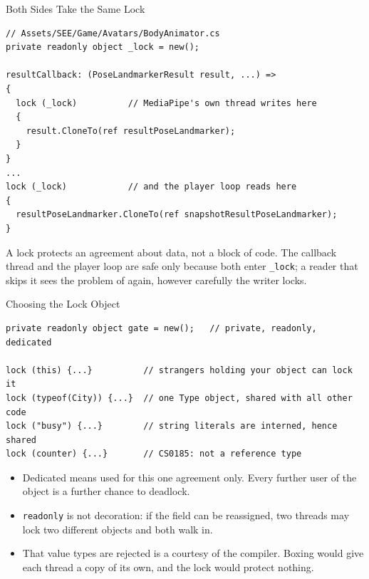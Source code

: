 \begin{frame}[fragile]{Both Sides Take the Same Lock}
  \begin{lstlisting}[basicstyle=\scriptsize\ttfamily]
// Assets/SEE/Game/Avatars/BodyAnimator.cs
private readonly object _lock = new();

resultCallback: (PoseLandmarkerResult result, ...) =>
{
  lock (_lock)          // MediaPipe's own thread writes here
  {
    result.CloneTo(ref resultPoseLandmarker);
  }
}
...
lock (_lock)            // and the player loop reads here
{
  resultPoseLandmarker.CloneTo(ref snapshotResultPoseLandmarker);
}
  \end{lstlisting}
  \vspace{1ex}

  A lock protects an agreement about data, not a block of code. The callback
  thread and the player loop are safe only because both enter
  \texttt{\_lock}; a reader that skips it sees the problem of
   again, however carefully the writer locks.
\end{frame}

\begin{frame}[fragile]{Choosing the Lock Object}
  \begin{lstlisting}[basicstyle=\scriptsize\ttfamily]
private readonly object gate = new();   // private, readonly, dedicated

lock (this) {...}          // strangers holding your object can lock it
lock (typeof(City)) {...}  // one Type object, shared with all other code
lock ("busy") {...}        // string literals are interned, hence shared
lock (counter) {...}       // CS0185: not a reference type
  \end{lstlisting}
  \vspace{1ex}

  \begin{itemize}
    \item Dedicated means used for this one agreement only. Every further user
      of the object is a further chance to deadlock.
    \item \texttt{readonly} is not decoration: if the field can be reassigned,
      two threads may lock two different objects and both walk in.
    \item That value types are rejected is a courtesy of the compiler. Boxing
      would give each thread a copy of its own, and the lock would protect
      nothing.
  \end{itemize}
\end{frame}

